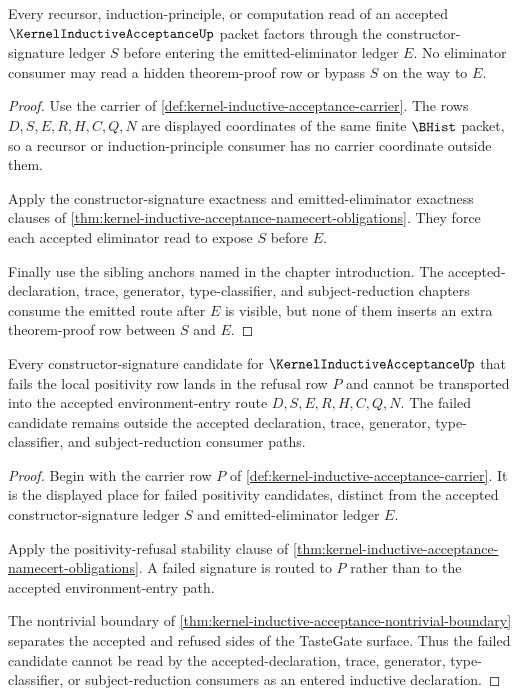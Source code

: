 \begin{theorem}
\label{thm:kernel-inductive-acceptance-eliminator-ledger-exhaustion}
Every recursor, induction-principle, or computation read of an accepted $\KernelInductiveAcceptanceUp$ packet factors through the constructor-signature ledger $S$ before entering the emitted-eliminator ledger $E$. No eliminator consumer may read a hidden theorem-proof row or bypass $S$ on the way to $E$.
\end{theorem}
\begin{proof}
Use the carrier of \autoref{def:kernel-inductive-acceptance-carrier}. The rows $D,S,E,R,H,C,Q,N$ are displayed coordinates of the same finite $\BHist$ packet, so a recursor or induction-principle consumer has no carrier coordinate outside them.

Apply the constructor-signature exactness and emitted-eliminator exactness clauses of \autoref{thm:kernel-inductive-acceptance-namecert-obligations}. They force each accepted eliminator read to expose $S$ before $E$.

Finally use the sibling anchors named in the chapter introduction. The accepted-declaration, trace, generator, type-classifier, and subject-reduction chapters consume the emitted route after $E$ is visible, but none of them inserts an extra theorem-proof row between $S$ and $E$.
\end{proof}

\begin{theorem}
\label{thm:kernel-inductive-acceptance-refusal-nonescape}
Every constructor-signature candidate for $\KernelInductiveAcceptanceUp$ that fails the local positivity row lands in the refusal row $P$ and cannot be transported into the accepted environment-entry route $D,S,E,R,H,C,Q,N$. The failed candidate remains outside the accepted declaration, trace, generator, type-classifier, and subject-reduction consumer paths.
\end{theorem}
\begin{proof}
Begin with the carrier row $P$ of \autoref{def:kernel-inductive-acceptance-carrier}. It is the displayed place for failed positivity candidates, distinct from the accepted constructor-signature ledger $S$ and emitted-eliminator ledger $E$.

Apply the positivity-refusal stability clause of \autoref{thm:kernel-inductive-acceptance-namecert-obligations}. A failed signature is routed to $P$ rather than to the accepted environment-entry path.

The nontrivial boundary of \autoref{thm:kernel-inductive-acceptance-nontrivial-boundary} separates the accepted and refused sides of the TasteGate surface. Thus the failed candidate cannot be read by the accepted-declaration, trace, generator, type-classifier, or subject-reduction consumers as an entered inductive declaration.
\end{proof}

